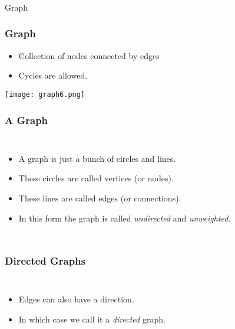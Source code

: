 \begin{frame}[fragile]\frametitle{}
\begin{center}
{\Large Graph}
\end{center}

\end{frame}

\begin{frame}
	\frametitle{Graph}
		\begin{itemize}
		\item Collection of nodes connected by edges
		\item Cycles are allowed.
		\end{itemize}
		
\begin{center}
\texttt{[image: graph6.png]}
\end{center}

\end{frame}


\begin{frame}
	\frametitle{A Graph}

	\begin{columns}[T]
		
		\begin{itemize}
			\item A graph is just a bunch of circles and lines.
				
			\item These circles are called \alert{vertices} (or \alert{nodes}).
				
			\item These lines are called \alert{edges} (or \alert{connections}).
				
			\item In this form the graph is called \textit{undirected} and \textit{unweighted}.
		\end{itemize}
	\end{columns}
\end{frame}

\begin{frame}
	\frametitle{Directed Graphs}
	
	\begin{columns}[T]

					


		\begin{itemize}
			\item Edges can also have a direction.
			\item In which case we call it a \textit{directed} graph.

		\end{itemize}
		

	\end{columns}
\end{frame}

